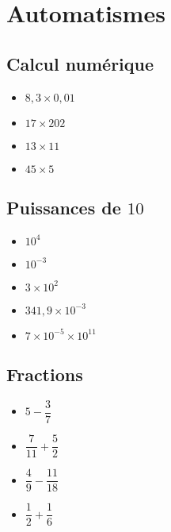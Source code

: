\documentclass[14pt]{beamer}
\begin{document}
\section{Automatismes}


\subsection{Calcul numérique}

\begin{frame}

	\begin{itemize} \itemsep2em 
		\item $8{,}3  \times  0{,}01$
		\item $17 \times 202$
		\item $13 \times 11$
		\item $45 \times 5$
	\end{itemize}

\end{frame}

\subsection{Puissances de $10$}

\begin{frame}

	\begin{itemize} \itemsep2em 
		\item $10^4$
		\item $10^{-3}$
		\item $3 \times 10^2$
		\item $341{,}9 \times 10^{-3}$
		\item $7 \times 10^{-5} \times 10^{11}$
	\end{itemize}

\end{frame}


\subsection{Fractions}

\begin{frame}

	\begin{itemize} \itemsep2em 
		\item $5 - \dfrac37$
		\item $\dfrac7{11} + \dfrac52$
		\item $\dfrac49 -  \dfrac{11}{18}$
		\item $\dfrac12 + \dfrac16$
	\end{itemize}


\end{frame}

%
%
%
\end{document}
